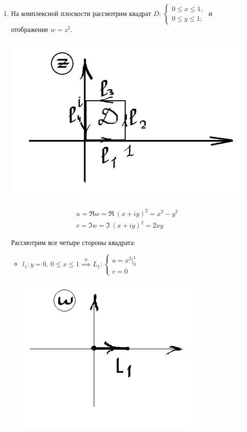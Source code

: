\documentclass[../../main.tex]{subfiles}
\begin{document}
\begin{examples}
\begin{enumerate}
\[\begin{gathered}
\text{Длина }L \stackrel{\eqref{lec30:1}}{=}
\left[
     f'(z) = \left(z^2\right)' = 2z
\right]
= \int\limits_l{2\abs z \abs{dz}} = 
\left[
  z = 1 + iy,\ y|_{-1}^1
\right]
=\\=
\left[
  \begin{array}{ccc}
     |z| = \sqrt{1 + y^2}\\
     dz = idy \implies |dz| = dy
  \end{array}
\right]
= 2 \int\limits_{-1}^1{\sqrt{1 + y^2}\ dy} = 
2\int\limits_0^1{\sqrt{1 + y^2}\ dy} =\\= 4
\left[
  \sqrt{1 + y^2} + \ln(y + \sqrt{1 + y^2})
\right]_0^1 =
2(\sqrt{2} + \ln(1 + \sqrt{2})).
\end{gathered}\]

\item На комплексной плоскости рассмотрим квадрат $D$:
$\begin{cases}
    0 \leq x \leq 1,\\
    0 \leq y \leq 1;
\end{cases}$ и отображение $w = z^2$.
\begin{center}
\includegraphics[height=0.3\textwidth]{lec30_3.png}
\end{center}
\[\begin{gathered}
u = \Re w = \Re\ (x + iy)^2 = x^2 - y^2 \\
v = \Im w = \Im\ (x + iy)^2 = 2xy
\end{gathered}\]

Рассмотрим все четыре стороны квадрата:

\begin{itemize}
\item[а)] $l_1: y = 0,\ 0 \leq x \leq 1 \stackrel{w}{\implies} L_1:
\begin{cases}
    u = x^2\big|_0^1\\
    v = 0
\end{cases}$
\begin{center}
\includegraphics[height=0.3\textwidth]{lec30_4.png}
\end{center}


\end{itemize}
\end{enumerate}
\end{examples}
\end{document}
